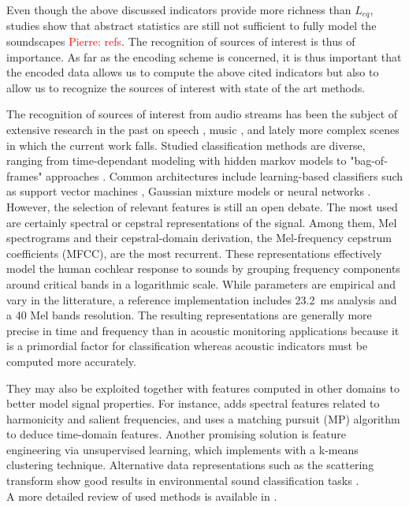 \documentclass[final,3p,times,twocolumn]{elsarticle}
\newcommand{\pa}[1]{\textcolor{red}{ Pierre: #1}}
\begin{document}
Even though the above discussed indicators provide more richness than $L_{eq}$, studies show that abstract statistics are still not sufficient to fully model the soundscapes \pa{refs}. The recognition of sources of interest is thus of importance. As far as the encoding scheme is concerned, it is thus important that the encoded data allows us to compute the above cited indicators but also to allow us to recognize the sources of interest with state of the art methods.

The recognition of sources of interest from audio streams has been the subject of extensive research in the past on speech \cite{anusuya2009}, music \cite{tzanetakis2002}, and lately more complex scenes in which the current work falls. Studied classification methods are diverse, ranging from time-dependant modeling with hidden markov models \cite{ntalampiras2014} to "bag-of-frames" approaches \cite{aucouturier2007, foggia2015}. Common architectures include learning-based classifiers such as support vector machines \cite{kumar2016}, Gaussian mixture models \cite{radhakrishnan2005} or neural networks \cite{salamon2017, piczak2015}. However, the selection of relevant features is still an open debate. The most used are certainly spectral \cite{khunarsal2013} or cepstral \cite{couvreur2004} representations of the signal. Among them, Mel spectrograms and their cepstral-domain derivation, the Mel-frequency cepstrum coefficients (MFCC), are the most recurrent. These representations effectively model the human cochlear response to sounds by grouping frequency components around critical bands in a logarithmic scale. While parameters are empirical and vary in the litterature, a reference implementation includes 23.2~ms analysis and a 40 Mel bands resolution. The resulting representations are generally more precise in time and frequency than in acoustic monitoring applications because it is a primordial factor for classification whereas acoustic indicators must be computed more accurately.

They may also be exploited together with features computed in other domains to better model signal properties. For instance, \cite{cai2006} adds spectral features related to harmonicity and salient frequencies, and \cite{chu2009} uses a matching pursuit (MP) algorithm to deduce time-domain features. Another promising solution is feature engineering via unsupervised learning, which \cite{salamon2015-2} implements with a k-means clustering technique. Alternative data representations such as the scattering transform \cite{bauge2013} show good results in environmental sound classification tasks \cite{salamon2015}.\\
A more detailed review of used methods is available in \cite{chachada2013}.
\end{document}
